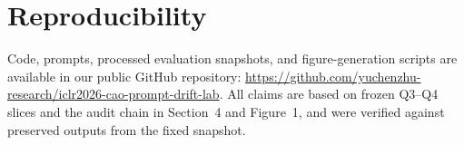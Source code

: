 \documentclass{article}
\begin{document}
\section*{Reproducibility}
Code, prompts, processed evaluation snapshots, and figure-generation scripts are available in our public GitHub repository: \url{https://github.com/yuchenzhu-research/iclr2026-cao-prompt-drift-lab}. 
All claims are based on frozen Q3--Q4 slices and the audit chain in Section~4 and Figure~1, and were verified against preserved outputs from the fixed snapshot.

\clearpage


\end{document}
